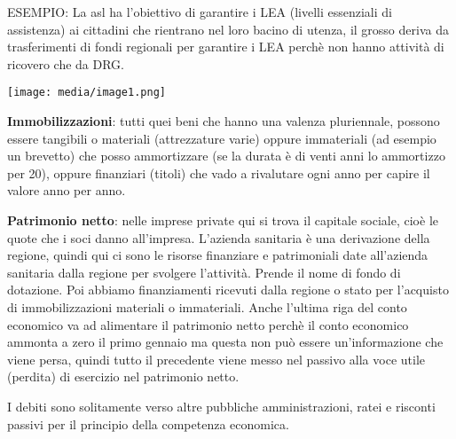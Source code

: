 \documentclass[]{article}
\begin{document}
ESEMPIO: La asl ha l'obiettivo di garantire i LEA (livelli essenziali di
assistenza) ai cittadini che rientrano nel loro bacino di utenza, il
grosso deriva da trasferimenti di fondi regionali per garantire i LEA
perchè non hanno attività di ricovero che da DRG.

\texttt{[image: media/image1.png]}

\textbf{Immobilizzazioni}: tutti quei beni che hanno una valenza
pluriennale, possono essere tangibili o materiali (attrezzature varie)
oppure immateriali (ad esempio un brevetto) che posso ammortizzare (se
la durata è di venti anni lo ammortizzo per 20), oppure finanziari
(titoli) che vado a rivalutare ogni anno per capire il valore anno per
anno.

\textbf{Patrimonio netto}: nelle imprese private qui si trova il
capitale sociale, cioè le quote che i soci danno all'impresa. L'azienda
sanitaria è una derivazione della regione, quindi qui ci sono le risorse
finanziare e patrimoniali date all'azienda sanitaria dalla regione per
svolgere l'attività. Prende il nome di fondo di dotazione. Poi abbiamo
finanziamenti ricevuti dalla regione o stato per l'acquisto di
immobilizzazioni materiali o immateriali. Anche l'ultima riga del conto
economico va ad alimentare il patrimonio netto perchè il conto economico
ammonta a zero il primo gennaio ma questa non può essere un'informazione
che viene persa, quindi tutto il precedente viene messo nel passivo alla
voce utile (perdita) di esercizio nel patrimonio netto.

I debiti sono solitamente verso altre pubbliche amministrazioni, ratei e
risconti passivi per il principio della competenza economica.
\end{document}
